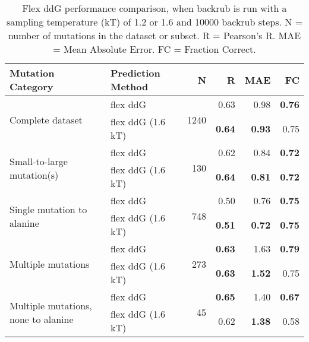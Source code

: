 \begin{table}
  \begin{tabular}{llrrrr}
\toprule
Mutation Category &  Prediction Method &     N &    R &  MAE &   FC \\
\midrule
 \multirow{ 2}{*}{Complete dataset} & flex ddG & \multirow{ 2}{*}{1240} & 0.63 & 0.98 & \textbf{0.76}  \\
 & flex ddG (1.6 kT) & & \textbf{0.64} & \textbf{0.93} & 0.75  \\
\hline
 \multirow{ 2}{*}{Small-to-large mutation(s)} & flex ddG & \multirow{ 2}{*}{130} & 0.62 & 0.84 & \textbf{0.72}  \\
 & flex ddG (1.6 kT) & & \textbf{0.64} & \textbf{0.81} & \textbf{0.72}  \\
\hline
 \multirow{ 2}{*}{Single mutation to alanine} & flex ddG & \multirow{ 2}{*}{748} & 0.50 & 0.76 & \textbf{0.75}  \\
 & flex ddG (1.6 kT) & & \textbf{0.51} & \textbf{0.72} & \textbf{0.75}  \\
\hline
 \multirow{ 2}{*}{Multiple mutations} & flex ddG & \multirow{ 2}{*}{273} & \textbf{0.63} & 1.63 & \textbf{0.79}  \\
 & flex ddG (1.6 kT) & & \textbf{0.63} & \textbf{1.52} & 0.75  \\
\hline
 \multirow{ 2}{*}{Multiple mutations, none to alanine} & flex ddG & \multirow{ 2}{*}{45} & \textbf{0.65} & 1.40 & \textbf{0.67}  \\
 & flex ddG (1.6 kT) & & 0.62 & \textbf{1.38} & 0.58  \\
\bottomrule
\end{tabular}
  \caption[Comparison of backrub temperature results]{
    Flex ddG performance comparison, when backrub is run with a sampling temperature (kT) of 1.2 or 1.6 and 10000 backrub steps. N = number of mutations in the dataset or subset. R = Pearson's R. MAE = Mean Absolute Error. FC = Fraction Correct.
  } \label{tab:table-temperature}
\end{table}
